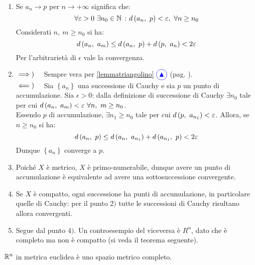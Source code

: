 \begin{demonstration}~{}
	\begin{enumerate}[label=\Roman*]
		\item Se $a_n\to p$ per $n\to +\infty$ significa che:
		\begin{equation*}
			\forall \epsilon>0\ \exists n_0\in\naturalset\ \colon \mvf{d}{a_n}{p}<\epsilon,\ \forall n\geq n_0
		\end{equation*}
	Considerati $n,\ m\geq n_0$ si ha:
	\begin{equation}
		d\left(a_n,\ a_m\right)\leq d\left(a_n,\ p\right)+d\left(p,\ a_n\right)< 2\varepsilon
	\end{equation}
Per l'arbitrarietà di $\epsilon$ vale la convergenza.
\item $\implies)\quad$ Sempre vera per  \ref{lemmatriangolino} $\textcolor{blue}{\circled{{\large \blacktriangle}}}$ (pag. \pageref{lemmatriangolino}).\\
$\impliedby)\quad$ Sia $\left\{a_n\right\}$ una successione di Cauchy e sia $p$ un punto di accumulazione. Sia $\epsilon>0$: dalla definizione di successione di Cauchy $\exists n_0$ tale per cui $\mvf{d}{a_n}{a_m}<\epsilon\ \forall n,\ m\geq n_0$.\\
Essendo $p$ di accumulazione, $\exists n_1\geq n_0$ tale per cui $d\left(p,\ a_{n_1}\right)<\varepsilon$. Allora, se $n\geq n_0$ si ha:
	\begin{equation*}
	d\left(a_n,\ p\right)\leq d\left(a_n,\ a_{n_1}\right)+d\left(a_{n_1},\ p\right)< 2\varepsilon
\end{equation*}
Dunque $\left\{a_n\right\}$ converge a $p$.
\item Poiché $X$ è metrico, $X$ è primo-numerabile, dunque avere un punto di accumulazione è equivalente ad avere una sottosuccessione convergente.
\item Se $X$ è compatto, ogni successione ha punti di accumulazione, in particolare quelle di Cauchy: per il punto $2)$ tutte le successioni di Cauchy risultano allora convergenti.
\item Segue dal punto $4)$. Un controesempio del viceversa è $R^n$, dato che è completo ma non è compatto (si veda il teorema seguente). 
\end{enumerate}
\end{demonstration}
\begin{theorema}
	$\mathbb{R}^n$ in metrica euclidea è uno spazio metrico completo.
\end{theorema}
